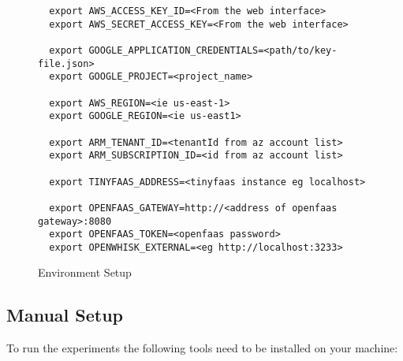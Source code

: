 \documentclass[../main.tex]{subfiles}
\begin{document}
\begin{figure}[H]
\begin{tcolorbox}
\begin{verbatim}
  export AWS_ACCESS_KEY_ID=<From the web interface>
  export AWS_SECRET_ACCESS_KEY=<From the web interface>

  export GOOGLE_APPLICATION_CREDENTIALS=<path/to/key-file.json>
  export GOOGLE_PROJECT=<project_name>

  export AWS_REGION=<ie us-east-1>
  export GOOGLE_REGION=<ie us-east1>

  export ARM_TENANT_ID=<tenantId from az account list>
  export ARM_SUBSCRIPTION_ID=<id from az account list>

  export TINYFAAS_ADDRESS=<tinyfaas instance eg localhost>

  export OPENFAAS_GATEWAY=http://<address of openfaas gateway>:8080
  export OPENFAAS_TOKEN=<openfaas password>
  export OPENWHISK_EXTERNAL=<eg http://localhost:3233>
\end{verbatim}
\end{tcolorbox}
\caption{Environment Setup}%
\label{fig:envSetup}
\end{figure}


\subsection{Manual Setup}\label{sec:manualsetup}

To run the experiments the following tools need to be installed on your machine:
\end{document}
